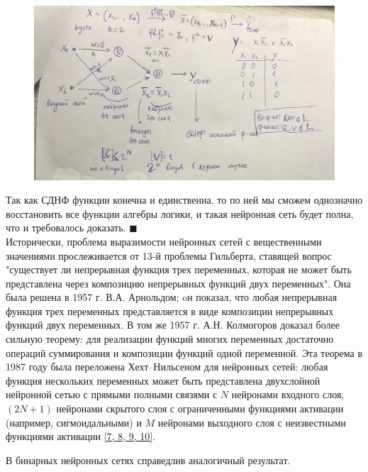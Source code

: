 \documentclass[a4paper, 14pt]{extarticle}
\begin{document}
    \begin{figure}[h]
    \begin{center}
    \includegraphics[width=1\linewidth]{picture1.png}
    \caption{}
    \label{ris:experimcoded}
    \end{center}
    \end{figure}
    
    Так как СДНФ функции конечна и единственна, то по ней мы сможем однозначно восстановить все функции алгебры логики, и такая нейронная сеть будет полна, что и требовалось доказать. \hfill $\blacksquare$\\
    
    Исторически, проблема выразимости нейронных сетей с вещественными значениями прослеживается от 13-й проблемы Гильберта, ставящей вопрос "существует ли непрерывная функция трех переменных, которая не может быть представлена через композицию непрерывных функций двух переменных". Она была решена в 1957 г. В.А. Арнольдом; oн показал, что любая непрерывная функция трех переменных представляется в виде композиции непрерывных функций двух переменных. В том же 1957 г. А.Н. Колмогоров доказал более сильную теорему: для реализации функций многих переменных достаточно операций суммирования и композиции функций одной переменной. Эта теорема в 1987 году была переложена Хехт–Нильсеном для нейронных сетей: любая функция нескольких переменных может быть представлена двухслойной нейронной сетью с прямыми полными связями с $N$ нейронами входного слоя, $(2N+1)$ нейронами скрытого слоя с ограниченными  функциями активации (например, сигмоидальными) и $M$ нейронами выходного слоя с неизвестными функциями активации \hyperlink{p7}{[7, 8, 9, 10]}.
    
    В бинарных нейронных сетях справедлив аналогичный результат.
    
\end{document}
